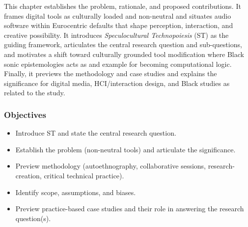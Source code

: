 


This chapter establishes the problem, rationale, and proposed contributions. It frames digital tools as culturally loaded and non-neutral and situates audio software within Eurocentric defaults that shape perception, interaction, and creative possibility. It introduces \textit{Speculocultural Technopoiesis} (ST) as the guiding framework, articulates the central research question and sub-questions, and motivates a shift toward culturally grounded tool modification where Black sonic epistemologies acts as and example for becoming computational logic. Finally, it previews the methodology and case studies and explains the significance for digital media, HCI/interaction design, and Black studies as related to the study.

\subsubsection{Objectives}
\begin{itemize}[nosep]
	\item Introduce ST and state the central research question.
	\item Establish the problem (non-neutral tools) and articulate the significance.
	\item Preview methodology (autoethnography, collaborative sessions, research-creation, critical technical practice).
	\item Identify scope, assumptions, and biases.
	\item Preview practice-based case studies and their role in answering the research question(s).
\end{itemize}

